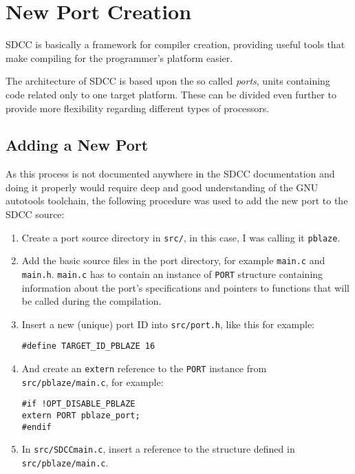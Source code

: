 \chapter{New Port Creation}\label{port}

SDCC is basically a framework for compiler creation, providing useful tools that make compiling for the programmer's platform easier.

The architecture of SDCC is based upon the so called \emph{ports}, units containing code related only to one target platform. These can be divided even further to provide more flexibility regarding different types of processors.

    \section{Adding a New Port}

    As this process is not documented anywhere in the SDCC documentation and doing it properly would require deep and good understanding of the GNU autotools toolchain, the following procedure was used to add the new port to the SDCC source:

    \begin{enumerate}

    \item Create a port source directory in \texttt{src/}, in this case, I was calling it \texttt{pblaze}.

    \item Add the basic source files in the port directory, for example \texttt{main.c} and \texttt{main.h}. \texttt{main.c} has to contain an instance of \texttt{PORT} structure containing information about the port's specifications and pointers to functions that will be called during the compilation.

    \item Insert a new (unique) port ID into \texttt{src/port.h}, like this for example:

    \texttt{\#define TARGET\_ID\_PBLAZE    16}

    \item And create an \texttt{extern} reference to the \texttt{PORT} instance from \texttt{src/pblaze/main.c}, for example:

\begin{verbatim}#if !OPT_DISABLE_PBLAZE
extern PORT pblaze_port;
#endif\end{verbatim}

    \item In \texttt{src/SDCCmain.c}, insert a reference to the structure defined in \texttt{src/pblaze/main.c}.

    \end{enumerate}

